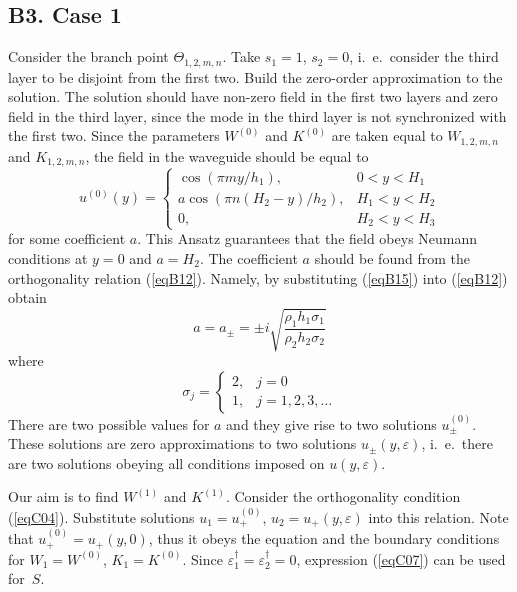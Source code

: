 \documentclass[12pt]{article}
\newcommand{\eps}{\varepsilon}
\begin{document}

\subsection*{B3. Case 1 }

Consider the branch point $\Theta_{1,2,m,n}$. Take $s_1 = 1$, $s_2 =0$, i.~e.\ consider the
third layer to be disjoint from the first two.  
Build the zero-order approximation to the solution. The solution should have non-zero field in the first two layers and zero field in  the third layer, since the mode in the third layer is not synchronized with the first two. Since the parameters $W^{(0)}$ and $K^{(0)}$ are taken equal to 
$W_{1,2,m,n}$ and $K_{1,2,m,n}$, the field in the waveguide should be equal to 
\begin{equation}
u^{(0)} (y) = 
\left \{ \begin{array}{ll}
\cos \left( \pi m y / h_1  \right) , & 0<y<H_1 \\ 
a \cos \left( \pi n (H_2 -y) / h_2 \right) , & H_1<y<H_2 \\
0 , & H_2< y <H_3
\end{array} \right.
\label{eqB15}
\end{equation} 
for some coefficient $a$. This Ansatz guarantees that the field obeys Neumann conditions at $y = 0$
and $a = H_2$. The coefficient $a$ should be found from the orthogonality relation
(\ref{eqB12}). Namely, by substituting (\ref{eqB15}) into (\ref{eqB12}) obtain
\begin{equation}
a = a_\pm =  \pm i \sqrt{\frac{\rho_1 h_1 \sigma_1}{\rho_2 h_2 \sigma_2}}
\label{eqB16}
\end{equation}
where 
\begin{equation}
\sigma_j = \left\{ \begin{array}{ll}
2, & j = 0 \\
1, & j = 1,2,3,\dots
\end{array} \right.
\label{eqB17}
\end{equation}
There are two possible values for $a$ and they give rise to two solutions $u^{(0)}_{\pm}$. 
These solutions are zero approximations to two solutions $u_\pm (y, \eps)$, i.~e.\ there
are two solutions obeying  all conditions imposed on $u (y, \eps)$.

Our aim is to find $W^{(1)}$ and $K^{(1)}$. 
Consider the orthogonality condition (\ref{eqC04}). Substitute solutions 
$u_1 = u_+^{(0)}$, $u_2 = u_+(y, \eps)$ into this relation. Note that $u^{(0)}_+ = u_+ (y,0)$, 
thus it obeys the equation and the boundary conditions for $W_1= W^{(0)}$, 
$K_1 = K^{(0)}$. Since $\eps_1^\dag = \eps_2^\dag = 0$, 
expression (\ref{eqC07}) can be used for~$S$.    
\end{document}
